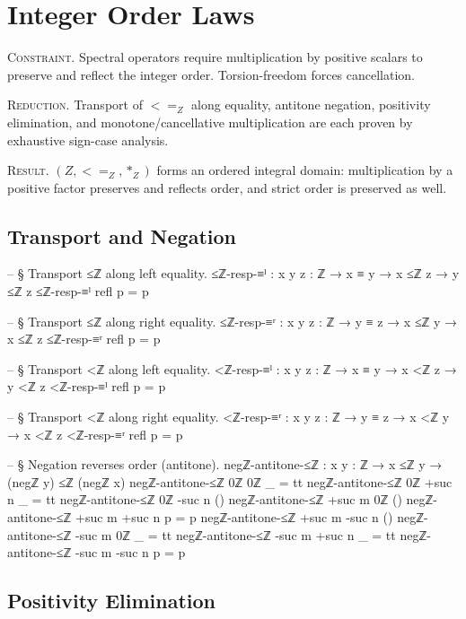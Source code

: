 \documentclass[11pt,a4paper]{book}
\def\leq{<=}%
\def\mathbb#1{#1}%
\begin{document}
\chapter{Integer Order Laws}

\textsc{Constraint.}
Spectral operators require multiplication by positive scalars to preserve and reflect
the integer order. Torsion-freedom forces cancellation.

\textsc{Reduction.}
Transport of $\leq_{\mathbb{Z}}$ along equality, antitone negation, positivity
elimination, and monotone/cancellative multiplication are each proven by exhaustive
sign-case analysis.

\textsc{Result.}
$(\mathbb{Z}, \leq_{\mathbb{Z}}, *_{\mathbb{Z}})$ forms an ordered integral domain:
multiplication by a positive factor preserves and reflects order, and strict order
is preserved as well.

\section{Transport and Negation}

\begin{code}
-- § Transport ≤ℤ along left equality.
≤ℤ-resp-≡ˡ : {x y z : ℤ} → x ≡ y → x ≤ℤ z → y ≤ℤ z
≤ℤ-resp-≡ˡ refl p = p

-- § Transport ≤ℤ along right equality.
≤ℤ-resp-≡ʳ : {x y z : ℤ} → y ≡ z → x ≤ℤ y → x ≤ℤ z
≤ℤ-resp-≡ʳ refl p = p

-- § Transport <ℤ along left equality.
<ℤ-resp-≡ˡ : {x y z : ℤ} → x ≡ y → x <ℤ z → y <ℤ z
<ℤ-resp-≡ˡ refl p = p

-- § Transport <ℤ along right equality.
<ℤ-resp-≡ʳ : {x y z : ℤ} → y ≡ z → x <ℤ y → x <ℤ z
<ℤ-resp-≡ʳ refl p = p

-- § Negation reverses order (antitone).
negℤ-antitone-≤ℤ : {x y : ℤ} → x ≤ℤ y → (negℤ y) ≤ℤ (negℤ x)
negℤ-antitone-≤ℤ {0ℤ} {0ℤ} _ = tt
negℤ-antitone-≤ℤ {0ℤ} {+suc n} _ = tt
negℤ-antitone-≤ℤ {0ℤ} { -suc n } ()
negℤ-antitone-≤ℤ {+suc m} {0ℤ} ()
negℤ-antitone-≤ℤ {+suc m} {+suc n} p = p
negℤ-antitone-≤ℤ {+suc m} { -suc n } ()
negℤ-antitone-≤ℤ { -suc m } {0ℤ} _ = tt
negℤ-antitone-≤ℤ { -suc m } {+suc n} _ = tt
negℤ-antitone-≤ℤ { -suc m } { -suc n } p = p
\end{code}

\section{Positivity Elimination}
\end{document}
